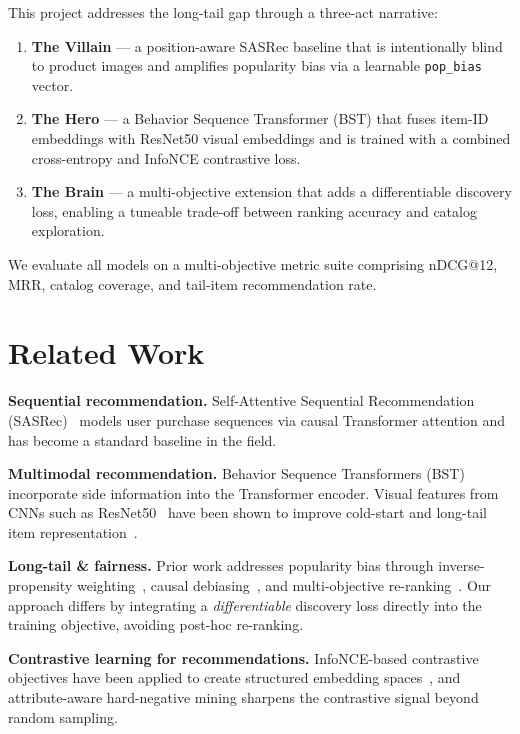 \documentclass[11pt, a4paper]{article}
\let\oldsection\section
\renewcommand{\section}[1]{\FloatBarrier\oldsection{#1}}
\begin{document}
This project addresses the long-tail gap through a three-act narrative:
\begin{enumerate}[leftmargin=*,itemsep=2pt]
    \item \textbf{The Villain} --- a position-aware SASRec baseline that is intentionally blind to product images and amplifies popularity bias via a learnable \texttt{pop\_bias} vector.
    \item \textbf{The Hero} --- a Behavior Sequence Transformer (BST) that fuses item-ID embeddings with ResNet50 visual embeddings and is trained with a combined cross-entropy and InfoNCE contrastive loss.
    \item \textbf{The Brain} --- a multi-objective extension that adds a differentiable discovery loss, enabling a tuneable trade-off between ranking accuracy and catalog exploration.
\end{enumerate}

We evaluate all models on a multi-objective metric suite comprising nDCG@12, MRR, catalog coverage, and tail-item recommendation rate.

\section{Related Work}
\label{sec:related}

\textbf{Sequential recommendation.}\quad
Self-Attentive Sequential Recommendation (SASRec)~\cite{kang2018self} models user purchase sequences via causal Transformer attention and has become a standard baseline in the field.

\textbf{Multimodal recommendation.}\quad
Behavior Sequence Transformers (BST)~\cite{chen2019behavior} incorporate side information into the Transformer encoder.
Visual features from CNNs such as ResNet50~\cite{he2016deep} have been shown to improve cold-start and long-tail item representation~\cite{liu2021noninvasive}.

\textbf{Long-tail \& fairness.}\quad
Prior work addresses popularity bias through inverse-propensity weighting~\cite{schnabel2016recommendations}, causal debiasing~\cite{zheng2021disentangling}, and multi-objective re-ranking~\cite{pei2019value}.
Our approach differs by integrating a \emph{differentiable} discovery loss directly into the training objective, avoiding post-hoc re-ranking.

\textbf{Contrastive learning for recommendations.}\quad
InfoNCE-based contrastive objectives have been applied to create structured embedding spaces~\cite{yao2021self}, and attribute-aware hard-negative mining sharpens the contrastive signal beyond random sampling.
\end{document}

